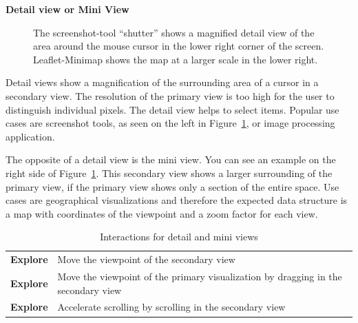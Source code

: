\textbf{Detail view or Mini View}
\begin{figure}
  \centering
    \qquad
  \caption{
    The screenshot-tool ``shutter'' shows a magnified detail view of the area around the mouse cursor in the lower right corner of the screen.
  Leaflet-Minimap shows the map at a larger scale in the lower right.
  }
  \label{fig:analysis:detail}
\end{figure}

Detail views show a magnification of the surrounding area of a cursor in a secondary view.
The resolution of the primary view is too high for the user to distinguish individual pixels.
The detail view helps to select items.
Popular use cases are screenshot tools, as seen on the left in Figure~\ref{fig:analysis:detail}, or image processing application.

The opposite of a detail view is the mini view.
You can see an example on the right side of Figure~\ref{fig:analysis:detail}.
This secondary view shows a larger surrounding of the primary view, if the primary view shows only a section of the entire space.
Use cases are geographical visualizations and therefore the expected data structure is a map with coordinates of the viewpoint and a zoom factor for each view.

\begin{table}
  \centering
  \caption{Interactions for detail and mini views}%
  \label{fig:analysis:detail:interactions}
  \begin{tabular}{ll}
    \bf Explore & Move the viewpoint of the secondary view \\
    \bf Explore & Move the viewpoint of the primary visualization by dragging in the secondary view \\
    \bf Explore & Accelerate scrolling by scrolling in the secondary view \\
  \end{tabular}
\end{table}

